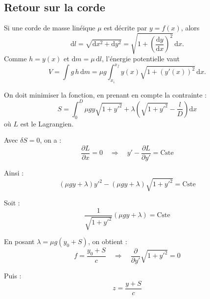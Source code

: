 \documentclass[french]{yLectureNote}
\newcommand{\dd}{\mathrm{d}}
\begin{document}
\subsection{Retour sur la corde}
Si une corde de masse linéique $\mu$ est décrite par $y=f(x)$, alors
\[
\dd l=\sqrt{\dd x^2+\dd y^2}
=\sqrt{1+\left(\frac{\dd y}{\dd x}\right)^2}\,\dd x.
\]
Comme $h=y(x)$ et $\dd m=\mu\,\dd l$, l'énergie potentielle vaut
\[
V=\int g\,h\,\dd m
=\mu g\int_{x_i}^{x_f} y(x)\sqrt{1+\left(y'(x)\right)^2}\,\dd x.
\]

On doit minimiser la fonction, en prenant en compte la contrainte :
\[
S = \int_{0}^{D} \mu g y \sqrt{1 + y'^2} + \lambda \left(\sqrt{1 + y'^2} - \frac{l}{D}\right) \dd x
\]
où $L$ est le Lagrangien.

Avec $\delta S = 0$, on a :
\[
\frac{\partial L}{\partial x} = 0 \quad \Rightarrow \quad y' - \frac{\partial L}{\partial y'} = \text{Cste}
\]

Ainsi :
\[
(\mu g y + \lambda) y'^2 - (\mu g y + \lambda) \sqrt{1 + y'^2} = \text{Cste}
\]

Soit :
\[
\frac{1}{\sqrt{1 + y'^2}} (\mu g y + \lambda) = \text{Cste}
\]

En posant $\lambda = \mu g (y_0 + S)$, on obtient :
\[
f = \frac{y_0 + S}{c} \quad \Rightarrow \quad \frac{\partial}{\partial y'}\sqrt{1 + y'^2} = 0
\]

Puis :
\[
z = \frac{y + S}{c}
\]
\end{document}
